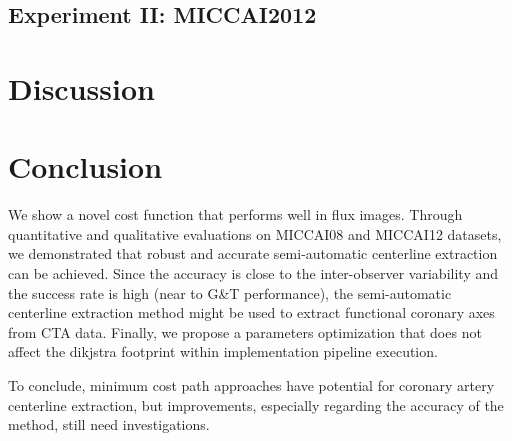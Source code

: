 \subsection{Experiment II: MICCAI2012}

\section{Discussion}

\section{Conclusion}

We show a novel cost function that performs well in flux images. Through quantitative and qualitative evaluations on MICCAI08 and MICCAI12 datasets, we demonstrated that robust and accurate semi-automatic centerline extraction can be achieved. Since the accuracy is close to the inter-observer variability and the success rate is high (near to G\&T performance), the semi-automatic centerline extraction method might be used to extract functional coronary axes from CTA data. Finally, we propose a parameters optimization that does not affect the dikjstra footprint within implementation pipeline execution.

To conclude, minimum cost path approaches have potential for coronary artery centerline extraction, but improvements, especially regarding the accuracy of the method, still need investigations.


